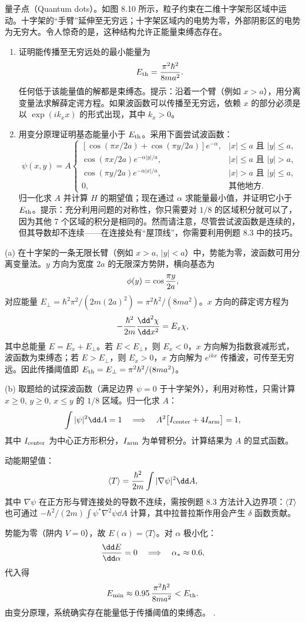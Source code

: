 \begin{question}
量子点（Quantum dots）。如图 8.10 所示，粒子约束在二维十字架形区域中运动。十字架的“手臂”延伸至无穷远；十字架区域内的电势为零，外部阴影区的电势为无穷大。令人惊奇的是，这种结构允许正能量束缚态存在。
\begin{enumerate}
\item 证明能传播至无穷远处的最小能量为
\[
E_{\rm th}=\frac{\pi^2\hbar^2}{8ma^2}.
\]
任何低于该能量值的解都是束缚态。提示：沿着一个臂（例如 $x>a$），用分离变量法求解薛定谔方程。如果波函数可以传播至无穷远，依赖 $x$ 的部分必须是以 $\exp(ik_xx)$ 的形式出现，其中 $k_x>0$。
\item 用变分原理证明基态能量小于 $E_{\rm th}$。采用下面尝试波函数：
\[
\psi(x,y)=A\begin{cases}
[\cos(\pi x/2a)+\cos(\pi y/2a)]e^{-\alpha}, & |x|\le a\text{ 且 }|y|\le a,\\
\cos(\pi x/2a)e^{-\alpha |y|/a}, & |x|\le a\text{ 且 }|y|>a,\\
\cos(\pi y/2a)e^{-\alpha |x|/a}, & |x|>a\text{ 且 }|y|\le a,\\
0, & \text{其他地方}.
\end{cases}
\]
归一化求 $A$ 并计算 $H$ 的期望值；现在通过 $\alpha$ 求能量最小值，并证明它小于 $E_{\rm th}$。提示：充分利用问题的对称性，你只需要对 $1/8$ 的区域积分就可以了，因为其他 7 个区域的积分是相同的。然而请注意，尽管尝试波函数是连续的，但其导数却不连续——在连接处有“屋顶线”，你需要利用例题 8.3 中的技巧。
\end{enumerate}
\end{question}
\begin{solution}
(a) 在十字架的一条无限长臂（例如 $x>a$, $|y|<a$）中，势能为零，波函数可用分离变量法。$y$ 方向为宽度 $2a$ 的无限深方势阱，横向基态为
\[
\phi(y)=\cos{\pi y\over2a},
\]
对应能量 $E_\perp=\hbar^2\pi^2/(2m(2a)^2)=\pi^2\hbar^2/(8ma^2)$。$x$ 方向的薛定谔方程为
\[
-{\hbar^2\over2m}{\dd^2\chi\over\dd x^2}=E_x\chi,
\]
其中总能量 $E=E_x+E_\perp$。若 $E<E_\perp$，则 $E_x<0$，$x$ 方向解为指数衰减形式，波函数为束缚态；若 $E>E_\perp$，则 $E_x>0$，$x$ 方向解为 $e^{ikx}$ 传播波，可传至无穷远。因此传播阈值即 $E_{\rm th}=E_\perp=\pi^2\hbar^2/(8ma^2)$。

(b) 取题给的试探波函数（满足边界 $\psi=0$ 于十字架外），利用对称性，只需计算 $x\ge0$, $y\ge0$, $x\le y$ 的 $1/8$ 区域。归一化求 $A$：
\[
\int|\psi|^2\dd A=1\quad\Longrightarrow\quad
A^2\bigl[I_{\rm center}+4I_{\rm arm}\bigr]=1,
\]
其中 $I_{\rm center}$ 为中心正方形积分，$I_{\rm arm}$ 为单臂积分。计算结果为 $A$ 的显式函数。

动能期望值：
\[
\langle T\rangle={\hbar^2\over2m}\int |\nabla\psi|^2\dd A,
\]
其中 $\nabla\psi$ 在正方形与臂连接处的导数不连续，需按例题 8.3 方法计入边界项：$\langle T\rangle$ 也可通过 $-\hbar^2/(2m)\int\psi^*\nabla^2\psi\dd A$ 计算，其中拉普拉斯作用会产生 $\delta$ 函数贡献。

势能为零（阱内 $V=0$），故 $E(\alpha)=\langle T\rangle$。对 $\alpha$ 极小化：
\[
{\dd E\over\dd\alpha}=0\quad\Longrightarrow\quad\alpha_*\approx0.6,
\]
代入得
\[
E_{\min}\approx0.95\,{\pi^2\hbar^2\over8ma^2}<E_{\rm th}.
\]
由变分原理，系统确实存在能量低于传播阈值的束缚态。
.
\end{solution}

